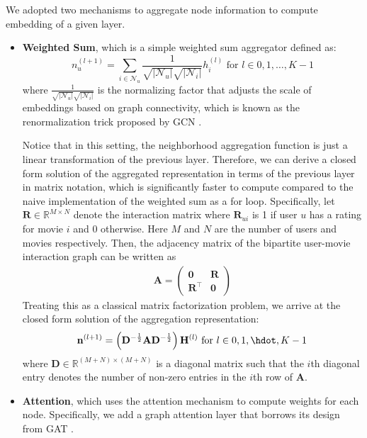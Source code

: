 \documentclass{article}
\begin{document}
We adopted two mechanisms to aggregate node information to compute embedding of a given layer. 
\begin{itemize}
    \item \textbf{Weighted Sum}, which is a simple weighted sum aggregator defined as: $$n_u^{(l+1)}=\sum_{i\in \mathcal{N}_u} \frac{1}{\sqrt{|\mathcal{N}_u|} \sqrt{|\mathcal{N}_i|}} h_i^{(l)} \text{ for } l \in 0, 1, \hdots, K - 1$$
    where $\frac{1}{\sqrt{|\mathcal{N}_u|} \sqrt{|\mathcal{N}_i|}}$ is the normalizing factor that adjusts the scale of embeddings based on graph connectivity, which is known as the renormalization trick proposed by GCN \cite{gcn}.

    Notice that in this setting, the neighborhood aggregation function is just a linear transformation of the previous layer. Therefore, we can derive a closed form solution of the aggregated representation in terms of the previous layer in matrix notation, which is significantly faster to compute compared to the naive implementation of the weighted sum as a for loop. Specifically, let $\mathbf{R} \in \mathbb{R}^{M \times N}$ denote the interaction matrix where $\mathbf{R}_{ui}$ is 1 if user $u$ has a rating for movie $i$ and 0 otherwise. Here $M$ and $N$ are the number of users and movies respectively. Then, the adjacency matrix of the bipartite user-movie interaction graph can be written as
    \begin{align*}
        \mathbf{A} =
        \begin{pmatrix}
        \mathbf{0} & \mathbf{R} \\
        \mathbf{R}^\top & \mathbf{0}
        \end{pmatrix}
    \end{align*}
    Treating this as a classical matrix factorization problem, we arrive at the closed form solution of the aggregation representation:
    \begin{align*}
        \mathbf{n}^{(l+1)} = \left( \mathbf{D}^{-\frac{1}{2}} \mathbf{A} \mathbf{D}^{-\frac{1}{2}} \right) \mathbf{H}^{(l)} \text{ for } l \in 0, 1, \hdot, K - 1
    \end{align*}
    where $\mathbf{D} \in \mathbb{R}^{(M + N) \times (M + N)}$ is a diagonal matrix such that the $i$th diagonal entry denotes the number of non-zero entries in the $i$th row of $\mathbf{A}$.
    
    \item \textbf{Attention}, which uses the attention mechanism to compute weights for each node. Specifically, we add a graph attention layer that borrows its design from GAT \cite{gat}. 
    

\end{itemize}
\end{document}
